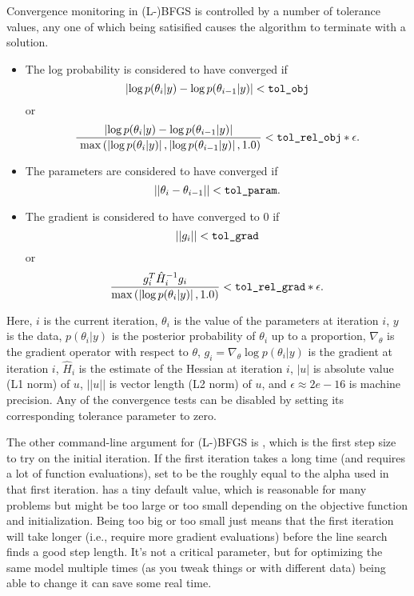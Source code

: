 Convergence monitoring in (L-)BFGS is controlled by a number of tolerance
values, any one of which being satisified causes the algorithm to
terminate with a solution.
%
\begin{itemize}
\item The log probability is considered to have converged if
\[
\left| \log p(\theta_{i}|y) - \log p(\theta_{i-1}|y) \right| <
\mbox{{\tt tol\_obj}}
\]
or
\[
\frac{\left| \log p(\theta_{i}|y) - \log p(\theta_{i-1}|y) \right|}{\
\max\left(\left| \log p(\theta_{i}|y)\right|,\left| \log p(\theta_{i-1}|y)\right|,1.0\right)}
 < \mbox{{\tt tol\_rel\_obj}} * \epsilon.
\]
\item The parameters are considered to have converged if
%
\\
\[
|| \theta_{i} - \theta_{i-1} || < \mbox{{\tt tol\_param}}.
\]
%
\item The gradient is considered to have converged to 0 if
\[
|| g_{i} || < \mbox{{\tt tol\_grad}}
\]
or
\[
\frac{g_{i}^T \hat{H}_{i}^{-1} g_{i} }{ \max\left(\left|\log p(\theta_{i}|y)\right|,1.0\right) } < \mbox{{\tt tol\_rel\_grad}} * \epsilon.
\]
\end{itemize}
%
Here, $i$ is the current iteration, $\theta_{i}$ is the value of the
parameters at iteration $i$, $y$ is the data, $p(\theta_{i}|y)$ is
the posterior probability of $\theta_{i}$ up to a proportion,
$\nabla_{\theta}$ is the gradient operator with respect to $\theta$,
$g_{i} = \nabla_{\theta} \log p(\theta_{i}|y)$ is the gradient at
iteration $i$, $\hat{H}_{i}$ is the estimate of the Hessian at
iteration $i$, $|u|$ is absolute value (L1 norm) of $u$,
$||u||$ is vector length (L2 norm) of $u$, and $\epsilon \approx 2e-16$ is
machine precision.  Any of the convergence tests can be disabled
by setting its corresponding tolerance parameter to zero.

The other command-line argument for (L-)BFGS is ,
which is the first step size to try on the initial iteration. If the
first iteration takes a long time (and requires a lot of function
evaluations), set  to be the roughly equal to the
alpha used in that first iteration.  \code{init\_alpha} has a tiny
default value, which is reasonable for many problems but might be too
large or too small depending on the objective function and
initialization. Being too big or too small just means that the first
iteration will take longer (i.e., require more gradient evaluations)
before the line search finds a good step length. It's not a critical
parameter, but for optimizing the same model multiple times (as
you tweak things or with different data) being able to change it can
save some real time.

